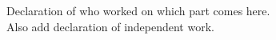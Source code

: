 \documentclass{article}
\begin{document}
    Declaration of who worked on which part comes here.\\
    Also add declaration of independent work.
\end{document}
